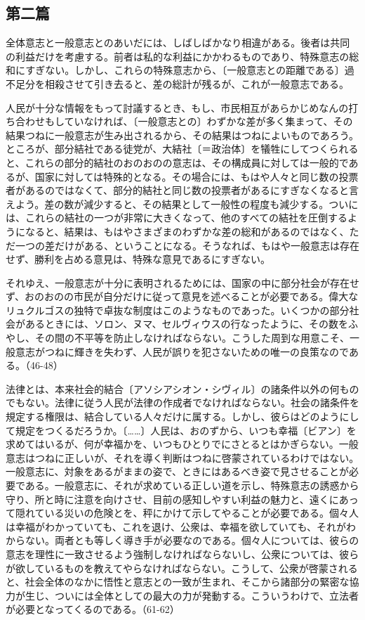 \subsection{第二篇}



全体意志と一般意志とのあいだには、しばしばかなり相違がある。後者は共同の利益だけを考慮する。前者は私的な利益にかかわるものであり、特殊意志の総和にすぎない。しかし、これらの特殊意志から、〔一般意志との距離である〕過不足分を相殺させて引き去ると、差の総計が残るが、これが一般意志である。

人民が十分な情報をもって討議するとき、もし、市民相互があらかじめなんの打ち合わせもしていなければ、〔一般意志との〕わずかな差が多く集まって、その結果つねに一般意志が生み出されるから、その結果はつねによいものであろう。ところが、部分結社である徒党が、大結社〔＝政治体〕を犠牲にしてつくられると、これらの部分的結社のおのおのの意志は、その構成員に対しては一般的であるが、国家に対しては特殊的となる。その場合には、もはや人々と同じ数の投票者があるのではなくて、部分的結社と同じ数の投票者があるにすぎなくなると言えよう。差の数が減少すると、その結果として一般性の程度も減少する。ついには、これらの結社の一つが非常に大きくなって、他のすべての結社を圧倒するようになると、結果は、もはやさまざまのわずかな差の総和があるのではなく、ただ一つの差だけがある、ということになる。そうなれば、もはや一般意志は存在せず、勝利を占める意見は、特殊な意見であるにすぎない。

それゆえ、一般意志が十分に表明されるためには、国家の中に部分社会が存在せず、おのおのの市民が自分だけに従って意見を述べることが必要である。偉大なリュクルゴスの独特で卓抜な制度はこのようなものであった。いくつかの部分社会があるときには、ソロン、ヌマ、セルヴィウスの行なったように、その数をふやし、その間の不平等を防止しなければならない。こうした周到な用意こそ、一般意志がつねに輝きを失わず、人民が誤りを犯さないための唯一の良策なのである。（46-48）


法律とは、本来社会的結合〔アソシアシオン・シヴィル〕の諸条件以外の何ものでもない。法律に従う人民が法律の作成者でなければならない。社会の諸条件を規定する権限は、結合している人々だけに属する。しかし、彼らはどのようにして規定をつくるだろうか。〔……〕人民は、おのずから、いつも幸福〔ビアン〕を求めてはいるが、何が幸福かを、いつもひとりでにさとるとはかぎらない。一般意志はつねに正しいが、それを導く判断はつねに啓蒙されているわけではない。一般意志に、対象をあるがままの姿で、ときにはあるべき姿で見させることが必要である。一般意志に、それが求めている正しい道を示し、特殊意志の誘惑から守り、所と時に注意を向けさせ、目前の感知しやすい利益の魅力と、遠くにあって隠れている災いの危険とを、秤にかけて示してやることが必要である。個々人は幸福がわかっていても、これを退け、公衆は、幸福を欲していても、それがわからない。両者とも等しく導き手が必要なのである。個々人については、彼らの意志を理性に一致させるよう強制しなければならないし、公衆については、彼らが欲しているものを教えてやらなければならない。こうして、公衆が啓蒙されると、社会全体のなかに悟性と意志との一致が生まれ、そこから諸部分の緊密な協力が生じ、ついには全体としての最大の力が発動する。こういうわけで、立法者が必要となってくるのである。（61-62）


